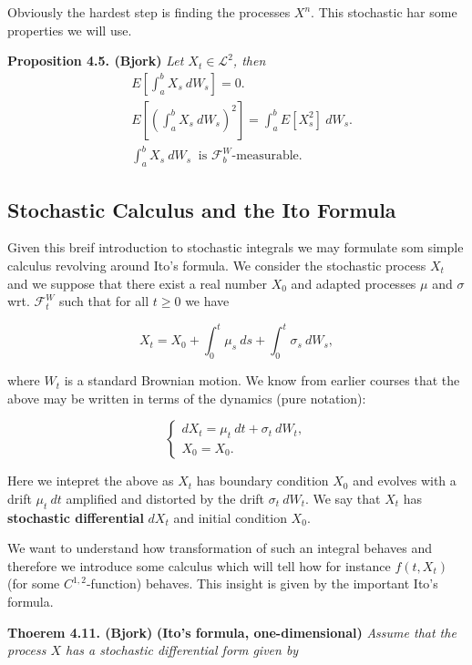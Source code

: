 \documentclass[a4paper,10pt,openany]{book}
\begin{document}
Obviously the hardest step is finding the processes \(X^n\). This stochastic har some properties we will use.

\textbf{Proposition 4.5. (Bjork)} \emph{Let \(X_t\in\mathcal{L}^2\), then}
\begin{align*}
&E\left[\int_a^b X_s\ dW_s\right]=0.\tag{4.12}\\
&E\left[\left(\int_a^b X_s\ dW_s\right)^2\right]=\int_a^b E[ X_s^2]\ dW_s.\tag{4.13}\\
&\int_a^b X_s\ dW_s\ \text{ is }\mathcal{F}_b^W\text{-measurable.}\tag{4.14}
\end{align*}

\hypertarget{stochastic-calculus-and-the-ito-formula}{%
\subsection{Stochastic Calculus and the Ito Formula}\label{stochastic-calculus-and-the-ito-formula}}

Given this breif introduction to stochastic integrals we may formulate som simple calculus revolving around Ito's formula. We consider the stochastic process \(X_t\) and we suppose that there exist a real number \(X_0\) and adapted processes \(\mu\) and \(\sigma\) wrt. \(\mathcal{F}_t^W\) such that for all \(t\ge0\) we have

\[
X_t=X_0+\int_0^t\mu_s\ ds+\int_0^t\sigma_s\ dW_s,\tag{4.16}
\]

where \(W_t\) is a standard Brownian motion. We know from earlier courses that the above may be written in terms of the dynamics (pure notation):

\[
\left\{\begin{matrix}dX_t=\mu_t\ dt+\sigma_t\ dW_t,\tag{4.17/18}\\ X_0=X_0.\end{matrix}\right.
\]

Here we intepret the above as \(X_t\) has boundary condition \(X_0\) and evolves with a drift \(\mu_t\ dt\) amplified and distorted by the drift \(\sigma_t\ dW_t\). We say that \(X_t\) has \textbf{stochastic differential} \(dX_t\) and initial condition \(X_0\).

We want to understand how transformation of such an integral behaves and therefore we introduce some calculus which will tell how for instance \(f(t,X_t)\) (for some \(C^{1,2}\)-function) behaves. This insight is given by the important Ito's formula.

\textbf{Thoerem 4.11. (Bjork)} \textbf{(Ito's formula, one-dimensional)} \emph{Assume that the process \(X\) has a stochastic differential form given by}
\end{document}
